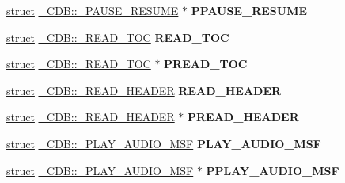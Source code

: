 \begin{DoxyCompactItemize}
\item 
\mbox{\label{union___c_d_b_a1ee07fac977537dbc915e11ec36fe1d4}} 
\hyperlink{interfacestruct}{struct} \hyperlink{struct___c_d_b_1_1___p_a_u_s_e___r_e_s_u_m_e}{\+\_\+\+C\+D\+B\+::\+\_\+\+P\+A\+U\+S\+E\+\_\+\+R\+E\+S\+U\+ME} $\ast$ {\bfseries P\+P\+A\+U\+S\+E\+\_\+\+R\+E\+S\+U\+ME}
\item 
\mbox{\label{union___c_d_b_afb6a1b1e3ce78dc754a339f14f65148c}} 
\hyperlink{interfacestruct}{struct} \hyperlink{struct___c_d_b_1_1___r_e_a_d___t_o_c}{\+\_\+\+C\+D\+B\+::\+\_\+\+R\+E\+A\+D\+\_\+\+T\+OC} {\bfseries R\+E\+A\+D\+\_\+\+T\+OC}
\item 
\mbox{\label{union___c_d_b_a11a24d0d0ec6f94ab26478e5a04d3f39}} 
\hyperlink{interfacestruct}{struct} \hyperlink{struct___c_d_b_1_1___r_e_a_d___t_o_c}{\+\_\+\+C\+D\+B\+::\+\_\+\+R\+E\+A\+D\+\_\+\+T\+OC} $\ast$ {\bfseries P\+R\+E\+A\+D\+\_\+\+T\+OC}
\item 
\mbox{\label{union___c_d_b_a1a82b6d1db5e4bb58a45ff509c278b96}} 
\hyperlink{interfacestruct}{struct} \hyperlink{struct___c_d_b_1_1___r_e_a_d___h_e_a_d_e_r}{\+\_\+\+C\+D\+B\+::\+\_\+\+R\+E\+A\+D\+\_\+\+H\+E\+A\+D\+ER} {\bfseries R\+E\+A\+D\+\_\+\+H\+E\+A\+D\+ER}
\item 
\mbox{\label{union___c_d_b_a03d37fec14a224b9aff2c3cc3e003112}} 
\hyperlink{interfacestruct}{struct} \hyperlink{struct___c_d_b_1_1___r_e_a_d___h_e_a_d_e_r}{\+\_\+\+C\+D\+B\+::\+\_\+\+R\+E\+A\+D\+\_\+\+H\+E\+A\+D\+ER} $\ast$ {\bfseries P\+R\+E\+A\+D\+\_\+\+H\+E\+A\+D\+ER}
\item 
\mbox{\label{union___c_d_b_ae4c9ec16bdd955b3cc1263dea52e6d22}} 
\hyperlink{interfacestruct}{struct} \hyperlink{struct___c_d_b_1_1___p_l_a_y___a_u_d_i_o___m_s_f}{\+\_\+\+C\+D\+B\+::\+\_\+\+P\+L\+A\+Y\+\_\+\+A\+U\+D\+I\+O\+\_\+\+M\+SF} {\bfseries P\+L\+A\+Y\+\_\+\+A\+U\+D\+I\+O\+\_\+\+M\+SF}
\item 
\mbox{\label{union___c_d_b_a17b3baf6f11ff21de8947158cd0f408e}} 
\hyperlink{interfacestruct}{struct} \hyperlink{struct___c_d_b_1_1___p_l_a_y___a_u_d_i_o___m_s_f}{\+\_\+\+C\+D\+B\+::\+\_\+\+P\+L\+A\+Y\+\_\+\+A\+U\+D\+I\+O\+\_\+\+M\+SF} $\ast$ {\bfseries P\+P\+L\+A\+Y\+\_\+\+A\+U\+D\+I\+O\+\_\+\+M\+SF}

\end{DoxyCompactItemize}
